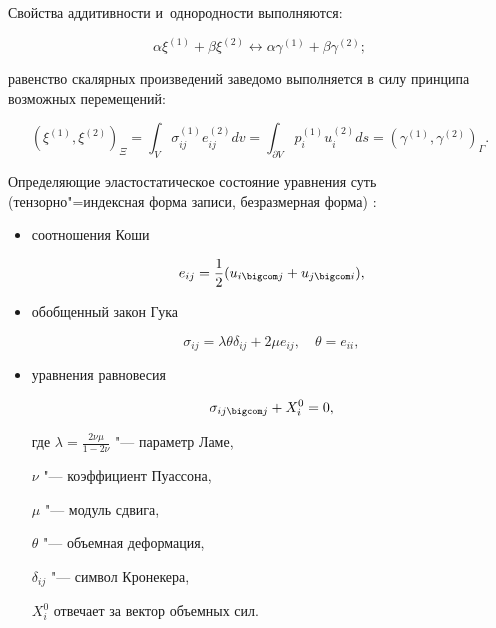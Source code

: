 Свойства аддитивности и~однородности выполняются:

\[\alpha \xi ^{(1)} +\beta \xi ^{(2)} \leftrightarrow \alpha \gamma ^{(1)} +\beta \gamma ^{(2)} ;\] 

равенство скалярных произведений заведомо выполняется в силу принципа возможных перемещений:

\begin{equation} \label{eq:ulg:Novi_eq1} 

(\xi ^{(1)} ,\xi ^{(2)} )_{\Xi } =

\int _{V}\sigma _{ij} ^{(1)}   e _{ij} ^{(2)}  dv =

\int _{\partial V}p_{i}^{(1)} u_{i}^{(2)} ds= (\gamma ^{(1)} , \gamma ^{(2)} )_{\Gamma } .                             

\end{equation}



Определяющие эластостатическое состояние уравнения суть (тензорно"=индексная форма записи, безразмерная форма) \cite{Novi_bib4}:

\begin{itemize}

\item[1)] соотношения Коши

\begin{equation} \label{eq:ulg:Novi_eq2} 

 e _{i j} =\frac{1}{2} (u_{i\bigcom j} +u_{j\bigcom i} ), 

\end{equation}

\item[2)] обобщенный закон Гука

\begin{equation} \label{eq:ulg:Novi_eq3} 

\sigma _{i j} =\lambda \theta  \delta _{i j} +2\mu e _{i j} ,\quad \theta =e _{i i} , 

\end{equation}

\item[3)] уравнения равновесия

\begin{equation} \label{eq:ulg:Novi_eq4} 

\sigma _{i j \bigcom j} + X _{i}^{0} =0, 

\end{equation} 

где $\lambda  =\frac{2\nu \mu }{1-2\nu }$ "--- параметр Ламе, 

$\nu $ "--- коэффициент Пуассона, 

$\mu $ "--- модуль сдвига, 

$\theta $ "--- объемная деформация, 

$\delta _{i j} $ "--- символ Кронекера, 

$X _{i}^{0} $ отвечает за вектор объемных сил.  



\end{itemize}



